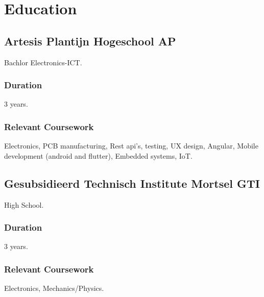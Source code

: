 \section{Educat\textcolor{mycolor}{ion}}
  \subsection{Artesis Plantijn Hogeschool \textcolor{mycolor}{AP}}
    \hspace*{\fill}{\textcolor{mygrey}{In progress}}

    Bachlor Electronics-ICT.
    \subsubsection{Duration}
      3 years.
    \subsubsection{Relevant Coursework}
      Electronics, PCB manufacturing, Rest api's, testing, UX design, Angular, Mobile development (android and flutter), Embedded systems, IoT.

      
    \subsection{Gesubsidieerd Technisch Institute Mortsel \textcolor{mycolor}{GTI}}
    \hspace*{\fill}{\textcolor{mygrey}{2016}}
    
    High School.
    \subsubsection{Duration}
      3 years.
    \subsubsection{Relevant Coursework}
      Electronics, Mechanics/Physics.
